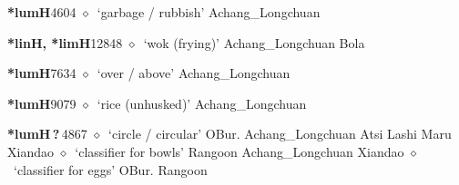   \begin{list}{}{\leftmargin=1.5em \itemindent=-1.5em}
  \item {\footnotesize \textbf{*lumH}}{\tiny 4604}
         $\diamond$~`garbage / rubbish'
         Achang\_Longchuan 
  \item {\footnotesize \textbf{*linH, *limH}}{\tiny 12848}
\hspace{1ex}
         $\diamond$~`wok (frying)'
         Achang\_Longchuan 
\hspace{1ex}
         Bola 
  \item {\footnotesize \textbf{*lumH}}{\tiny 7634}
\hspace{1ex}
         $\diamond$~`over / above'
         Achang\_Longchuan 
  \item {\footnotesize \textbf{*lumH}}{\tiny 9079}
\hspace{1ex}
         $\diamond$~`rice (unhusked)'
         Achang\_Longchuan 
  \item {\footnotesize \textbf{*lumH\,?\,}}{\tiny 4867}
\hspace{1ex}
         $\diamond$~`circle / circular'
         OBur. 
\hspace{1ex}
         Achang\_Longchuan 
\hspace{1ex}
         Atsi 
\hspace{1ex}
         Lashi 
\hspace{1ex}
         Maru 
\hspace{1ex}
         Xiandao 
\hspace{1ex}
         $\diamond$~`classifier for bowls'
         Rangoon 
\hspace{1ex}
         Achang\_Longchuan 
\hspace{1ex}
         Xiandao 
\hspace{1ex}
         $\diamond$~`classifier for eggs'
         OBur. 
\hspace{1ex}
         Rangoon 
\hspace{1ex}

\end{list}
